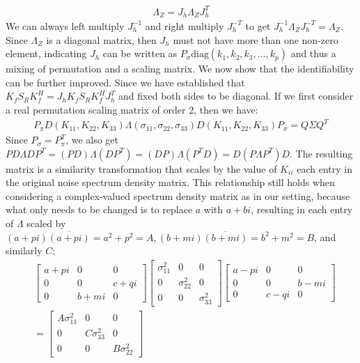 \documentclass[10pt]{article}
\numberwithin{figure}{section}
\begin{document}
\begin{align}
    \Lambda_Z= J_h\Lambda_{Z} J_h^{T}
\end{align}
We can always left multiply $J_h^{-1}$ and right multiply $J_h^{-T}$ to get $J_h^{-1}\Lambda_Z J_h^{-T}=\Lambda_Z$. Since $\Lambda_Z$ is a diagonal matrix, then $J_h$ must not have more than one non-zero element, indicating $J_h$ can be written as $P_{\sigma}\mathrm{diag}(k_1,k_2,k_3,\dots,k_p)$ and thus a mixing of permutation and a scaling matrix. We now show that the identifiability can be further improved. Since we have established that $K_fS_RK_f^H = J_hK_fS_RK_f^HJ_h^T$ and fixed both sides to be diagonal. If we first consider a real permutation scaling matrix of order 2, then we have:
\begin{align}
    P_{\pi}D(K_{11},K_{22},K_{33})\Lambda (\sigma_{11},\sigma_{22},\sigma_{33})D(K_{11},K_{22},K_{33})P_{\sigma}=Q\Sigma Q^T
\end{align}
Since $P_{\sigma}=P_{\pi}^T$, we also get $PD\Lambda DP^T=(PD)\Lambda(DP^T)=(DP)\Lambda(P^TD)=D(P\Lambda P^T)D$.  The resulting matrix is a similarity transformation that scales by the value of $K_{ii} $ each entry in the original noise spectrum density matrix. This relationship still holds when considering a complex-valued spectrum density matrix as in our setting, because what only needs to be changed is to replace $a$ with $a+bi$, resulting in each entry of $\Lambda$ scaled by $(a+pi)\overline{(a+pi)}=a^2+p^2=A,(b+mi)\overline{(b+mi)}=b^2+m^2=B$, and similarly $C$:
\begin{align}
      &\left [
    \begin{array}{ccc}
    a+pi &  0 &  0 \\
    0 &  0 & c+qi\\
  0 & b+mi& 0
\end{array}
    \right]\left[\begin{array}{ccc}
    \sigma^2_{11} &  0 &  0 \\
    0 &  \sigma^2_{22} & 0\\
  0 & 0&\sigma^2_{33}
\end{array}\right]\left [
    \begin{array}{ccc}
    a-pi &  0 &  0 \\
    0 &  0 & b-mi\\
  0 & c-qi& 0
\end{array}
    \right]\\
    &=\left[\begin{array}{ccc}
    A\sigma^2_{11} &  0 &  0 \\
    0 &  C\sigma^2_{33} & 0\\
  0 & 0& B\sigma^2_{22}
\end{array}\right]
\end{align}
\end{document}
